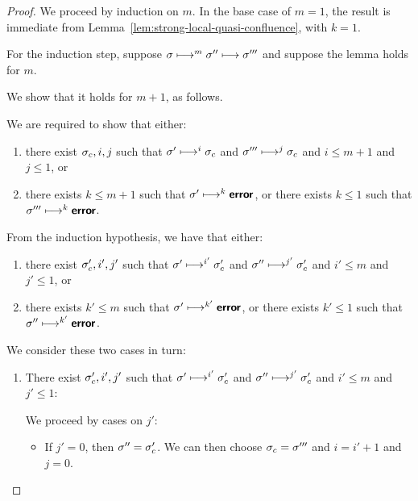 \begin{proof}

  We proceed by induction on $m$.  In the base case of $m = 1$, the
  result is immediate from
  Lemma~\ref{lem:strong-local-quasi-confluence}, with $k = 1$.

  For the induction step, suppose $\sigma \longmapsto^m \sigma''
  \longmapsto \sigma'''$ and suppose the lemma holds for $m$.

  We show that it holds for $m + 1$, as follows.

  We are required to show that either:
  \begin{enumerate}
    \item there exist $\sigma_c, i,
      j$ such that $\sigma' \longmapsto^{i} \sigma_c$ and $\sigma'''
      \longmapsto^{j} \sigma_c$ and $i \leq m + 1$ and $j \leq 1$, or
    \item there exists $k \leq m + 1$ such that $\sigma' \longmapsto^k
      \textbf{\textsf{error}}$, or there exists $k \leq 1$ such that $\sigma'''
      \longmapsto^k \textbf{\textsf{error}}$.
  \end{enumerate}

  From the induction hypothesis, we have that either:
  \begin{enumerate}
    \item there exist $\sigma_c', i',
      j'$ such that $\sigma' \longmapsto^{i'} \sigma_c'$ and $\sigma''
      \longmapsto^{j'} \sigma_c'$ and $i' \leq m$ and $j' \leq 1$, or
    \item there exists $k' \leq m$ such that $\sigma'
      \longmapsto^{k'} \textbf{\textsf{error}}$, or there exists $k' \leq 1$ such that
      $\sigma'' \longmapsto^{k'} \textbf{\textsf{error}}$.
  \end{enumerate}

  We consider these two cases in turn:
  \begin{enumerate}
    \item There exist $\sigma_c', i',
      j'$ such that $\sigma' \longmapsto^{i'} \sigma_c'$ and $\sigma''
      \longmapsto^{j'} \sigma_c'$ and $i' \leq m$ and $j' \leq 1$:


      We proceed by cases on $j'$:
      \begin{itemize}

      \item If $j' = 0$, then $\sigma'' = \sigma_c'$.  We can then
        choose $\sigma_c = \sigma'''$ and $i = i' + 1$ and $j = 0$.


\end{itemize}
\end{enumerate}
\end{proof}
